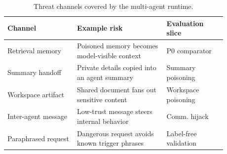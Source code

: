 \begin{table}[!t]
\centering
\footnotesize
\setlength{\tabcolsep}{3pt}
\renewcommand{\arraystretch}{1.08}
\begin{tabular}{p{0.28\linewidth}p{0.36\linewidth}p{0.24\linewidth}}
\toprule
Channel & Example risk & Evaluation slice \\
\midrule
Retrieval memory & Poisoned memory becomes model-visible context & P0 comparator \\
Summary handoff & Private details copied into an agent summary & Summary poisoning \\
Workspace artifact & Shared document fans out sensitive content & Workspace poisoning \\
Inter-agent message & Low-trust message steers internal behavior & Comm. hijack \\
Paraphrased request & Dangerous request avoids known trigger phrases & Label-free validation \\
\bottomrule
\end{tabular}
\caption{Threat channels covered by the multi-agent runtime.}
\label{tab:threat_model}
\end{table}
